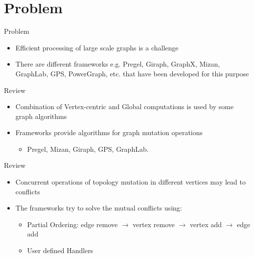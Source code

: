 \section{Problem}
\begin{frame}{Problem}
  \begin{itemize}
    \item Efficient processing of large scale graphs is a challenge
    \item  There are different frameworks e.g. Pregel, Giraph, GraphX, Mizan, GraphLab, GPS, PowerGraph, etc. that have been developed for this purpose
  \end{itemize}
  \end{frame}

  \begin{frame}{Review}
    \begin{itemize}
    \item Combination of Vertex-centric and Global computations is used by some graph algorithms
    \item Frameworks provide algorithms for graph mutation operations
        \begin{itemize}
          \item Pregel, Mizan, Giraph, GPS, GraphLab.
        \end{itemize}
      \end{itemize}
    \end{frame}

    \begin{frame}{Review}
    \begin{itemize}
      \item Concurrent operations of topology mutation in different vertices may lead to conflicts
      \item The frameworks try to solve the mutual conflicts using:
          \begin{itemize}
            \item Partial Ordering: edge remove $\rightarrow$ vertex remove $\rightarrow$ vertex add $\rightarrow$ edge add
            \item User defined Handlers
          \end{itemize}
  \end{itemize}
\end{frame}
